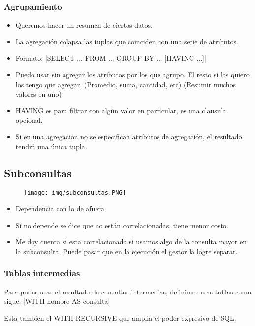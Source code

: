 \subsubsection*{Agrupamiento}

\begin{itemize}
\item Queremos hacer un resumen de ciertos datos.
\item La agregación colapsa las tuplas que coinciden con una serie de atributos.
\item Formato: |SELECT ... FROM ... GROUP BY ... [HAVING ...]|
\item Puedo usar sin agregar los atributos por los que agrupo. El resto si los quiero los tengo que agregar. (Promedio, suma, cantidad, etc) (Resumir muchos valores en uno)
\item HAVING es para filtrar con algún valor en particular, es una clausula opcional.
\item Si en una agregación no se especifican atributos de agregación, el resultado tendrá una única tupla.
\end{itemize}


\subsection*{Subconsultas}

\begin{figure}[!htb]
    \centering
    \texttt{[image: img/subconsultas.PNG]}
\end{figure}

\begin{itemize}
\item Dependencia con lo de afuera
\item Si no depende se dice que no están correlacionadas, tiene menor costo.
\item Me doy cuenta si esta correlacionada si usamos algo de la consulta mayor en la subconsulta. Puede pasar que en la ejecución el gestor la logre separar.
\end{itemize}


\subsubsection*{Tablas intermedias}
Para poder usar el resultado de consultas intermedias, definimos esas tablas como sigue:
|WITH nombre AS consulta|

\medskip
Esta tambien el WITH RECURSIVE que amplia el poder expresivo de SQL.


